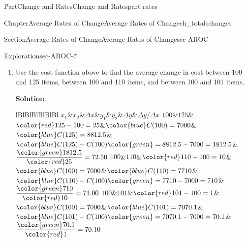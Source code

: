 \documentclass{tufte-book}
\newcommand{\blocktitlefont}{\relax}
\newcommand{\tabularfont}{\relax}
\numberwithin{equation}{chapter}
\newcommand{\hrulemedium}{\noalign{\hrule height 0.07em}}
\begin{document}
\begin{partptx}{Part}{Change and Rates}{}{Change and Rates}{}{}{part-rates}
\begin{chapterptx}{Chapter}{Average Rates of Change}{}{Average Rates of Change}{}{}{ch_totalschanges}
\begin{sectionptx}{Section}{Average Rates of Change}{}{Average Rates of Change}{}{}{sec-AROC}
\begin{exploration}{Exploration}{}{sec-AROC-7}
\begin{enumerate}[font=\bfseries,label=(\alph*),ref=\alph*]
. Dividing the total cost \(\Delta C\) evenly among the \(\Delta x\) items results in an \emph{average} cost per item of%
\begin{equation*}
\dfrac{\Delta C}{\Delta x} = \dfrac{3,750}{50} = 75 \frac{\$}{\text{item}}
\end{equation*}
%
\par
There were a lot of parts of this calculation.  You can either use a the definition \(\dfrac{\Delta C}{\Delta x} = \dfrac{C(x_2) - C(x_1)}{x_2 - x_1} \) which is a single formula that combines all of these steps, or you can organize the different parts separately using the table below. This is called an Average Rate of Change table, often abbreviated AROC. \begin{center}%
{\tabularfont%
\begin{tabular}{lBlBlBlBlBlBl}
\(x_1\)&\(x_2\)&\(\Delta x\)&\(y_1\)&\(y_2\)&\(\Delta y\)&\(\Delta y/\Delta x\)\tabularnewline\hrulemedium
\(100\)&\(150\)&\(50\)&\(7000\)&\(10750\)&\(3750\)&\(75\)
\end{tabular}
}%
\end{center}%
%
\item\label{task_costfunctionwithdecreasingquantity}Use the cost function above to find the average change in cost between 100 and 125 items, between 100 and 110 items, and between 100 and 101 items.%
\par\smallskip%
\noindent\textbf{\blocktitlefont Solution}.\hypertarget{task_costfunctionwithdecreasingquantity-2}{}\quad{}\begin{center}%
{\tabularfont%
\begin{tabular}{lBlBlBlBlBlBl}
\(x_1\)&\(x_2\)&\(\Delta x\)&\(y_1\)&\(y_2\)&\(\Delta y\)&\(\Delta y/\Delta x\)\tabularnewline\hrulemedium
\(100\)&\(125\)&\(\color{red} 	125 - 100 = 25\)&\(\color{blue} C(100) = 7000\)&\(\color{blue} C(125) = 8812.5\)&\(\color{blue} C(125) - C(100) \color{green} = 8812.5 - 7000 = 1812.5 \)&\(\dfrac{\color{green} 1812.5}{\color{red} 25} = 72.50  \)\tabularnewline\hrulemedium
\(100\)&\(110\)&\(\color{red} 	110 - 100 = 10\)&\(\color{blue} C(100) = 7000\)&\(\color{blue} C(110) = 7710 \)&\(\color{blue} C(110) - C(100) \color{green} = 7710 - 7000 = 710 \)&\(\dfrac{\color{green} 710}{\color{red} 10} = 71.00  \)\tabularnewline\hrulemedium
\(100\)&\(101\)&\(\color{red} 	101 - 100 = 1\)&\(\color{blue} C(100) = 7000\)&\(\color{blue} C(101) = 7070.1\)&\(\color{blue} C(101) - C(100) \color{green} =  7070.1 - 7000 = 70.1\)&\(\dfrac{\color{green} 70.1}{\color{red} 1} =  70.10 \)
\end{tabular}
}
\end{center}
\end{enumerate}
\end{exploration}
\end{sectionptx}
\end{chapterptx}
\end{partptx}
\end{document}
